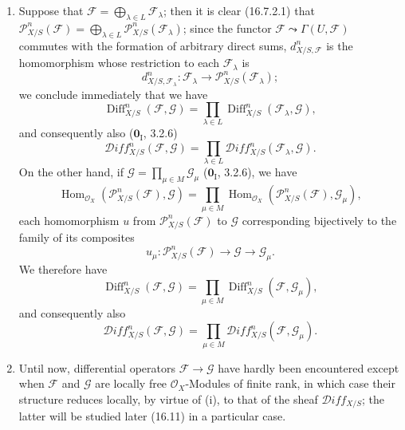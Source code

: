 \begin{remarks}[16.8.11]
\label{IV.16.8.11}
\begin{enumerate}
  \item[(i)] Suppose that
  $\mathscr{F}=\bigoplus_{\lambda\in L}\mathscr{F}_\lambda$; then it is
  clear (16.7.2.1) that
  $\mathscr{P}_{X/S}^n(\mathscr{F})=
  \bigoplus_{\lambda\in L}\mathscr{P}_{X/S}^n(\mathscr{F}_\lambda)$; since the
  functor $\mathscr{F}\leadsto\Gamma(U,\mathscr{F})$ commutes with the formation
  of arbitrary direct sums, $d_{X/S,\mathscr{F}}^n$ is
  the homomorphism whose restriction to each $\mathscr{F}_\lambda$ is
  \[
    d_{X/S,\mathscr{F}_\lambda}^n:\mathscr{F}_\lambda
    \longrightarrow\mathscr{P}_{X/S}^n(\mathscr{F}_\lambda);
  \]
  we conclude immediately that we have
  \[
    \operatorname{Diff}_{X/S}^n(\mathscr{F},\mathscr{G})
    =\prod_{\lambda\in L}
    \operatorname{Diff}_{X/S}^n(\mathscr{F}_\lambda,\mathscr{G}),
  \]
  and consequently also ($\mathbf{0}_{\mathrm I}$, 3.2.6)
  \[
    \mathscr{D}\!iff_{X/S}^n(\mathscr{F},\mathscr{G})
    =\prod_{\lambda\in L}
    \mathscr{D}\!iff_{X/S}^n(\mathscr{F}_\lambda,\mathscr{G}).
  \]
  On the other hand, if $\mathscr{G}=\prod_{\mu\in M}\mathscr{G}_\mu$
  ($\mathbf{0}_{\mathrm I}$, 3.2.6), we have
  \[
    \operatorname{Hom}_{\mathcal{O}_X}
    (\mathscr{P}_{X/S}^n(\mathscr{F}),\mathscr{G})
    =\prod_{\mu\in M}\operatorname{Hom}_{\mathcal{O}_X}
    (\mathscr{P}_{X/S}^n(\mathscr{F}),\mathscr{G}_\mu),
  \]
  each homomorphism $u$ from $\mathscr{P}_{X/S}^n(\mathscr{F})$ to
  $\mathscr{G}$ corresponding bijectively to the family of its composites
  \[
    u_\mu:\mathscr{P}_{X/S}^n(\mathscr{F})
    \longrightarrow\mathscr{G}\longrightarrow\mathscr{G}_\mu.
  \]
  We therefore have
  \[
    \operatorname{Diff}_{X/S}^n(\mathscr{F},\mathscr{G})
    =\prod_{\mu\in M}
    \operatorname{Diff}_{X/S}^n(\mathscr{F},\mathscr{G}_\mu),
  \]
  and consequently also
  \[
    \mathscr{D}\!iff_{X/S}^n(\mathscr{F},\mathscr{G})
    =\prod_{\mu\in M}
    \mathscr{D}\!iff_{X/S}^n(\mathscr{F},\mathscr{G}_\mu).
  \]
  \item[(ii)] Until now, differential operators
  $\mathscr{F}\to\mathscr{G}$ have hardly been encountered except when
  $\mathscr{F}$ and $\mathscr{G}$ are locally free $\mathcal{O}_X$-Modules of
  finite rank, in which case their structure reduces locally, by virtue
  of (i), to that of the sheaf $\mathscr{D}\!iff_{X/S}$; the latter will be
  studied later (16.11) in a particular case.
\end{enumerate}
\end{remarks}


